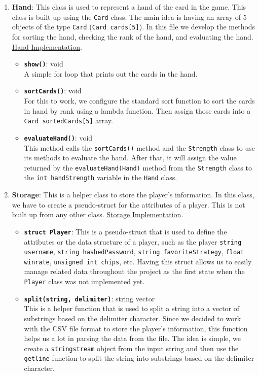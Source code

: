 \begin{enumerate}
    \item \textbf{Hand}: This class is used to represent a hand of the card in the game. This class is built up using the \texttt{Card} class. The main idea is having an array of 5 objects of the type \texttt{Card} (\texttt{Card cards[5]}). In this file we develop the methods for sorting the hand, checking the rank of the hand, and evaluating the hand. \href{https://github.com/anhtri2407/Poker/blob/main/src/core/Hand.cpp}{Hand Implementation}.
    \begin{itemize}
        \item \texttt{\textbf{show()}}: void \\ A simple for loop that prints out the cards in the hand.
        \item \texttt{\textbf{sortCards()}}: void \\  For this to work, we configure the standard sort function to sort the cards in hand by rank using a lambda function. Then assign those cards into a \texttt{Card sortedCards[5]} array.
        \item \texttt{\textbf{evaluateHand()}}: void \\ This method calls the \texttt{sortCards()} method and the \texttt{Strength} class to use its methods to evaluate the hand. After that, it will assign the value returned by the \texttt{evaluateHand(Hand)} method from the \texttt{Strength} class to the \texttt{int handStrength} variable in the \texttt{Hand} class.
    \end{itemize}
    \item \textbf{Storage}: This is a helper class to store the player's information. In this class, we have to create a pseudo-struct for the attributes of a player. This is not built up from any other class. \href{https://github.com/anhtri2407/Poker/blob/main/src/core/Storage.cpp}{Storage Implementation}.
    \begin{itemize}
        \item \textbf{\texttt{struct Player}}: This is a pseudo-struct that is used to define the attributes or the data structure of a player, such as the player \texttt{string username}, \texttt{string hashedPassword}, \texttt{string favoriteStrategy}, \texttt{float winrate}, \texttt{unsigned int chips}, etc. Having this struct allows us to easily manage related data throughout the project as the first state when the \texttt{Player} class was not implemented yet.
        \item \texttt{\textbf{split(string, delimiter)}}: string vector \\ This is a helper function that is used to split a string into a vector of substrings based on the delimiter character. Since we decided to work with the CSV file format to store the player's information, this function helps us a lot in parsing the data from the file. The idea is simple, we create a \texttt{stringstream} object from the input string and then use the \texttt{getline} function to split the string into substrings based on the delimiter character.

\end{itemize}
\end{enumerate}
